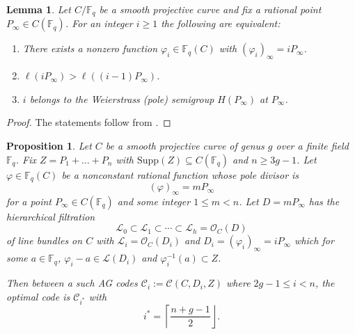 \documentclass[14pt]{amsart}
\theoremstyle{plain}
\newtheorem{prop}[thm]{\bf Proposition}
\newtheorem{lem}[thm]{\bf Lemma}
\theoremstyle{definition}
\theoremstyle{remark}
\theoremstyle{example}
\def \F{\mathbb{F}}
\def \L{\mathcal{L}}
\def \O{\mathcal{O}}
\def \C{\mathcal{C}}
\def \Supp{\mathrm{Supp}}
\begin{document}
\begin{lem}
\label{existence-varphi}
Let $C/\F_{q}$ be a smooth projective curve and fix a rational point
$P_\infty\in C(\F_{q})$. For an integer $i\ge 1$ the following are
equivalent:
\begin{enumerate}
\item There exists a nonzero function $\varphi_i\in\F_{q}(C)$ with
      $(\varphi_i)_\infty = iP_\infty$.
\item $\ell(iP_\infty)>\ell((i-1)P_\infty)$.
\item $i$ belongs to the Weierstrass (pole) semigroup $H(P_\infty)$ at
      $P_\infty$.
\end{enumerate}
\end{lem}

\begin{proof}
The statements follow from \cite[Sec. 1.6]{St}.


\end{proof}


 
\begin{prop}
\label{prop:middle-layer}
Let $C$ be a smooth projective curve of genus $g$ over a finite field $\F_q$. Fix $Z=P_1+\ldots+P_n$ with $\Supp(Z)\subseteq C(\F_q)$ and $n\geq 3g-1$. Let 
$\varphi\in\F_{q}(C)$ be a nonconstant rational function whose pole divisor
is
$$
(\varphi)_\infty = mP_\infty
$$
for a point $P_\infty\in C(\F_{q})$ and some integer $1\leq m<n$. Let $D=mP_\infty$ has the hierarchical filtration 
$$\L_0\subset\L_1\subset\cdots\subset\L_h=\O_C(D)$$
of line bundles on $C$ with $\L_i=\O_C(D_i)$ and $D_i=(\varphi_i)_\infty=iP_\infty$ which for some $a\in\F _q$, $\varphi_i-a\in\L(D_i)$ and $\varphi^{-1}_i(a)\subset Z$.

Then between a such AG codes $\C_i:=\C(C,D_i,Z)$ where $2g-1\leq i<n$, the optimal code is $\C_{i^*}$ with $$i^*=\left\lceil \frac{n+g-1}{2} \right\rfloor.$$
\end{prop}
\end{document}
